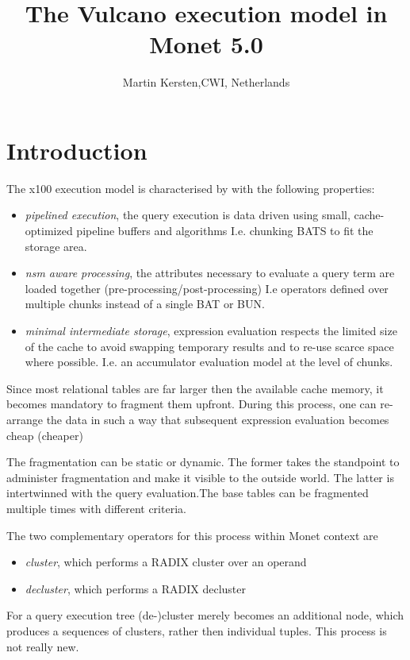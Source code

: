 \documentclass[10pt,twocolumn,fleqn]{article}
\begin{document}
\title{The Vulcano execution model in Monet 5.0}
\author{ Martin Kersten,{\small \textsc{CWI}, Netherlands}}
\date{}
\maketitle

\section{Introduction}
The x100 execution model is characterised by with the following properties:
\begin{itemize}
\item {\em pipelined execution}, the query execution is data driven using 
small, cache-optimized pipeline buffers and algorithms
I.e. chunking BATS to fit the storage area.
\item{\em nsm aware processing}, the attributes necessary to evaluate a 
query term are loaded together (pre-processing/post-processing)
I.e operators defined over multiple chunks instead of a single BAT or BUN.
\item{\em minimal intermediate storage}, expression evaluation respects 
the limited size of the cache to avoid swapping temporary results and
to re-use scarce space where possible.
I.e. an accumulator evaluation model at the level of chunks.
\end{itemize}

Since most relational tables are far larger then the available cache memory, 
it becomes mandatory to fragment them upfront. During this process, 
one can re-arrange the data in such a way that subsequent expression 
evaluation becomes cheap (cheaper)

The fragmentation can be static or dynamic. The former takes the standpoint
to administer fragmentation and make it visible to the outside world.
The latter is intertwinned with the query evaluation.The base tables can be
fragmented multiple times with different criteria.

The two complementary operators for this process within Monet context are
\begin{itemize}
\item {\em cluster}, which performs a RADIX cluster over an operand
\item{\em decluster}, which performs a RADIX decluster
\end{itemize}

For a query execution tree (de-)cluster merely becomes an additional node, 
which produces a sequences of clusters, rather then individual tuples.
This process is not really new.
\end{document}
